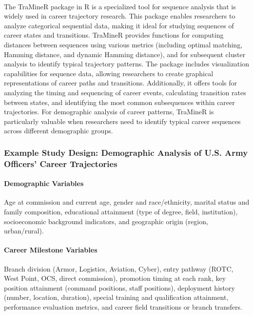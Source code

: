 \documentclass[../main.tex]{subfiles}
\begin{document}
\paragraph{} The TraMineR package in R is a specialized tool for sequence analysis that is widely used in career trajectory research. This package enables researchers to analyze categorical sequential data, making it ideal for studying sequences of career states and transitions. TraMineR provides functions for computing distances between sequences using various metrics (including optimal matching, Hamming distance, and dynamic Hamming distance), and for subsequent cluster analysis to identify typical trajectory patterns. The package includes visualization capabilities for sequence data, allowing researchers to create graphical representations of career paths and transitions. Additionally, it offers tools for analyzing the timing and sequencing of career events, calculating transition rates between states, and identifying the most common subsequences within career trajectories. For demographic analysis of career patterns, TraMineR is particularly valuable when researchers need to identify typical career sequences across different demographic groups.

\subsubsection{Example Study Design: Demographic Analysis of U.S. Army Officers' Career Trajectories}


\paragraph{Demographic Variables} Age at commission and current age, gender and race/ethnicity, marital status and family composition, educational attainment (type of degree, field, institution), socioeconomic background indicators, and geographic origin (region, urban/rural).

\paragraph{Career Milestone Variables} Branch division (Armor, Logistics, Aviation, Cyber), entry pathway (ROTC, West Point, OCS, direct commission), promotion timing at each rank, key position attainment (command positions, staff positions), deployment history (number, location, duration), special training and qualification attainment, performance evaluation metrics, and career field transitions or branch transfers.
\end{document}
